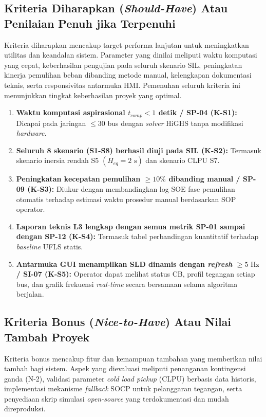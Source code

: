\subsection{Kriteria Diharapkan (\textit{Should-Have}) Atau Penilaian Penuh jika Terpenuhi}
\label{subsec:Kriteria_Diharapkan}

Kriteria diharapkan mencakup target performa lanjutan untuk meningkatkan utilitas dan keandalan sistem. Parameter yang dinilai meliputi waktu komputasi yang cepat, keberhasilan pengujian pada seluruh skenario SIL, peningkatan kinerja pemulihan beban dibanding metode manual, kelengkapan dokumentasi teknis, serta responsivitas antarmuka HMI. Pemenuhan seluruh kriteria ini menunjukkan tingkat keberhasilan proyek yang optimal.

\begin{enumerate}
    \item[a.] \textbf{Waktu komputasi aspirasional $t_{comp}<1$ detik / SP-04 (K-S1):} Dicapai pada jaringan $\le 30$ bus dengan \textit{solver} HiGHS tanpa modifikasi \textit{hardware}.
    \item[b.] \textbf{Seluruh 8 skenario (S1-S8) berhasil diuji pada SIL (K-S2):} Termasuk skenario inersia rendah S5 $(H_{eq}=2\text{ s})$ dan skenario CLPU S7.
    \item[c.] \textbf{Peningkatan kecepatan pemulihan $\ge 10\%$ dibanding manual / SP-09 (K-S3):} Diukur dengan membandingkan log SOE fase pemulihan otomatis terhadap estimasi waktu prosedur manual berdasarkan SOP operator.
    \item[d.] \textbf{Laporan teknis L3 lengkap dengan semua metrik SP-01 sampai dengan SP-12 (K-S4):} Termasuk tabel perbandingan kuantitatif terhadap \textit{baseline} UFLS statis.
    \item[e.] \textbf{Antarmuka GUI menampilkan SLD dinamis dengan \textit{refresh} $\ge 5\text{ Hz}$ / SI-07 (K-S5):} Operator dapat melihat status CB, profil tegangan setiap bus, dan grafik frekuensi \textit{real-time} secara bersamaan selama algoritma berjalan.
\end{enumerate}

\subsection{Kriteria Bonus (\textit{Nice-to-Have}) Atau Nilai Tambah Proyek}
\label{subsec:Kriteria_Bonus}

Kriteria bonus mencakup fitur dan kemampuan tambahan yang memberikan nilai tambah bagi sistem. Aspek yang dievaluasi meliputi penanganan kontingensi ganda (N-2), validasi parameter \textit{cold load pickup} (CLPU) berbasis data historis, implementasi mekanisme \textit{fallback} SOCP untuk pelanggaran tegangan, serta penyediaan skrip simulasi \textit{open-source} yang terdokumentasi dan mudah direproduksi.

